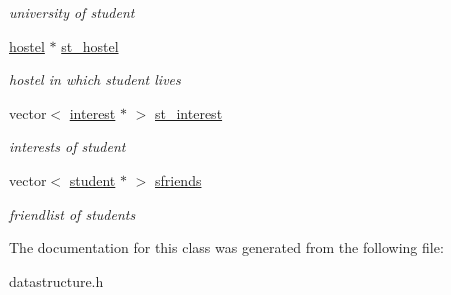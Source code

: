 \begin{DoxyCompactItemize}
\begin{DoxyCompactList}\small\item\em university of student \end{DoxyCompactList}\item 
\hypertarget{classstudent_a39a0879d8477b542bd0df3b8be096e66}{\hyperlink{classhostel}{hostel} $\ast$ \hyperlink{classstudent_a39a0879d8477b542bd0df3b8be096e66}{st\-\_\-hostel}}\label{classstudent_a39a0879d8477b542bd0df3b8be096e66}

\begin{DoxyCompactList}\small\item\em hostel in which student lives \end{DoxyCompactList}\item 
\hypertarget{classstudent_aef55166ca700881072752dd731cd97ed}{vector$<$ \hyperlink{classinterest}{interest} $\ast$ $>$ \hyperlink{classstudent_aef55166ca700881072752dd731cd97ed}{st\-\_\-interest}}\label{classstudent_aef55166ca700881072752dd731cd97ed}

\begin{DoxyCompactList}\small\item\em interests of student \end{DoxyCompactList}\item 
\hypertarget{classstudent_aeacf26d9f2c0d5938fea035c744e8119}{vector$<$ \hyperlink{classstudent}{student} $\ast$ $>$ \hyperlink{classstudent_aeacf26d9f2c0d5938fea035c744e8119}{sfriends}}\label{classstudent_aeacf26d9f2c0d5938fea035c744e8119}

\begin{DoxyCompactList}\small\item\em friendlist of students \end{DoxyCompactList}\end{DoxyCompactItemize}


\-The documentation for this class was generated from the following file\-:\begin{DoxyCompactItemize}
\item 
datastructure.\-h\end{DoxyCompactItemize}
